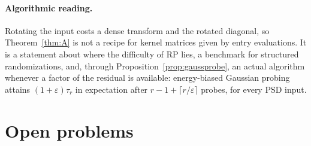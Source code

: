 \documentclass[11pt,a4paper]{article}
\theoremstyle{definition}
\begin{document}
\paragraph{Algorithmic reading.} Rotating the input costs a dense transform and the rotated diagonal, so Theorem~\ref{thm:A} is not a recipe for kernel matrices given by entry evaluations. It is a statement about where the difficulty of RP lies, a benchmark for structured randomizations, and, through Proposition~\ref{prop:gaussprobe}, an actual algorithm whenever a factor of the residual is available: energy-biased Gaussian probing attains $(1+\varepsilon)\tau_r$ in expectation after $r-1+\lceil r/\varepsilon\rceil$ probes, for every PSD input.

\section{Open problems}\label{sec:open}
\end{document}
